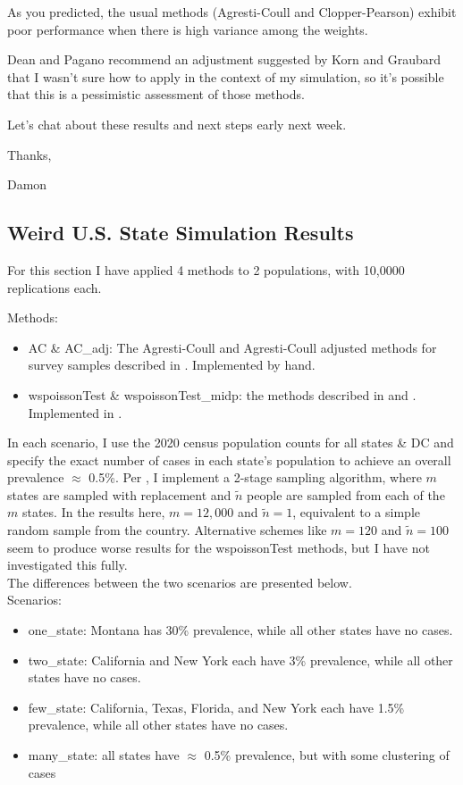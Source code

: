 \documentclass{article}
\begin{document}
As you predicted, the usual methods (Agresti-Coull and Clopper-Pearson) exhibit poor performance when there is high variance among the weights.

Dean and Pagano recommend an adjustment suggested by Korn and Graubard that I wasn’t sure how to apply in the context of my simulation, so it’s possible that this is a pessimistic assessment of those methods. 

Let’s chat about these results and next steps early next week.

Thanks,

Damon



\subsection{Weird U.S. State Simulation Results}

For this section I have applied 4 methods to 2 populations, with 10,0000 replications each.

\noindent Methods:
\begin{itemize}
    \item AC \& AC\_adj: The Agresti-Coull and Agresti-Coull adjusted methods for survey samples described in \cite{Dean:2015}. Implemented by hand.
    \item wspoissonTest \& wspoissonTest\_midp: the methods described in \cite{FayF:1997} and \cite{FayK:2017}. Implemented in \cite{asht}.
\end{itemize}

In each scenario, I use the 2020 census population counts for all states \& DC and specify the exact number of cases in each state's population to achieve an overall prevalence $\approx$  0.5\%.
Per \cite{Lemeshow1985SurveysTM}, I implement a 2-stage sampling algorithm, where $m$ states are sampled with replacement and $\tilde{n}$ people are sampled from each of the $m$ states.
In the results here, $m = 12,000$ and $\tilde{n} = 1$, equivalent to a simple random sample from the country.
Alternative schemes like $m = 120$ and $\tilde{n} = 100$ seem to produce worse results for the wspoissonTest methods, but I have not investigated this fully.\\
The differences between the two scenarios are presented below.\\

\noindent Scenarios:
\begin{itemize}
    \item one\_state: Montana has 30\% prevalence, while all other states have no cases.
    \item two\_state: California and New York each have 3\% prevalence, while all other states have no cases.
    \item few\_state: California, Texas, Florida, and New York each have 1.5\% prevalence, while all other states have no cases.
    \item many\_state: all states have $\approx$ 0.5\% prevalence, but with some clustering of cases
\end{itemize}
\end{document}
